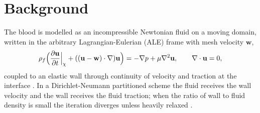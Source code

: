 \chapter{Background}
\label{ch:background}

The blood is modelled as an incompressible Newtonian fluid on a moving domain, written in the
arbitrary Lagrangian-Eulerian (ALE) frame with mesh velocity $\mathbf{w}$,
\begin{equation}
  \rho_f \Bigl(\frac{\partial \mathbf{u}}{\partial t}\Big|_{\chi} + ((\mathbf{u}-\mathbf{w})
  \cdot\nabla)\mathbf{u}\Bigr) = -\nabla p + \mu \nabla^{2}\mathbf{u},
  \qquad \nabla\cdot\mathbf{u} = 0 ,
  \label{eq:ale}
\end{equation}
coupled to an elastic wall through continuity of velocity and traction at the interface
\citep{hughes1981}. In a Dirichlet-Neumann partitioned scheme the fluid receives the wall
velocity and the wall receives the fluid traction; when the ratio of wall to fluid density is
small the iteration diverges unless heavily relaxed \citep{causin2005}.
